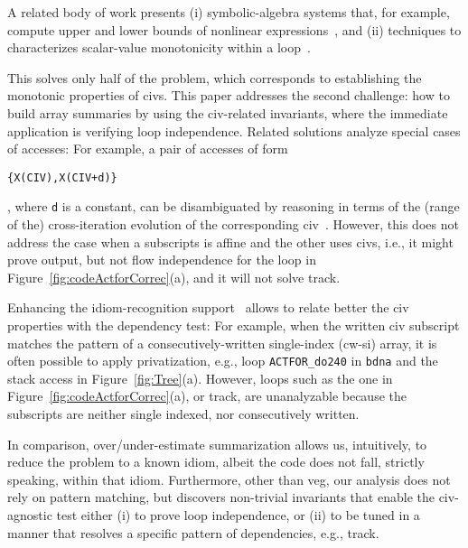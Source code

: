 \documentclass[10pt,nocopyrightspace]{sigplanconf}
\begin{document}
A related  body of work presents (i) symbolic-algebra systems that, for example,  
compute upper and lower bounds of nonlinear expressions~\cite{Fahringer97EffSymb},
and (ii) techniques to characterizes scalar-value monotonicity within a 
loop~\cite{VEG,MonStmt}.

This solves only half of the problem, which   
corresponds to establishing the monotonic properties of {\sc civ}s.
This paper addresses the second challenge: 
how to build array summaries by using the {\sc civ}-related invariants,
where the immediate application is verifying loop independence. 
Related solutions analyze special cases of accesses:
%
For example, a pair of accesses of form  
\begin{small}{\tt\{X(CIV),X(CIV+d)\}}\end{small}, where {\tt d} is a constant,
can be disambiguated by reasoning in terms of the (range of the) cross-iteration 
evolution of the corresponding {\sc civ}~\cite{CohenBeyondMon}.
%
However, this does not address the case when a subscripts is affine
and the other uses {\sc civ}s, i.e., it might prove output, but not 
flow independence for the loop in Figure~\ref{fig:codeActforCorrec}(a), 
and it will not solve {\sc track}. 

Enhancing the idiom-recognition support~\cite{PaduaDemDrInterproc} %
allows to relate better the {\sc civ} properties with the dependency test: 
For example, when the written {\sc civ} subscript matches the pattern 
of a consecutively-written single-index ({\sc cw-si}) array, it is often
possible to apply privatization, e.g., loop {\tt ACTFOR\_do240} in {\tt bdna}
and the stack access in Figure~\ref{fig:Tree}(a). %
%
However, loops such as the one in Figure~\ref{fig:codeActforCorrec}(a),
or {\sc track}, are unanalyzable because the subscripts are neither single 
indexed, nor consecutively written.  

In comparison, over/under-estimate summarization allows us,
intuitively, to reduce the problem to a known idiom, albeit
the code does not fall, strictly speaking, within that idiom.
Furthermore, other than {\sc veg}, our analysis does not rely
on pattern matching, but discovers non-trivial invariants that
enable the {\sc civ}-agnostic test either (i) to prove loop independence,
or (ii) to be tuned in a manner that resolves a specific pattern 
of dependencies, e.g., {\sc track}.
\end{document}
